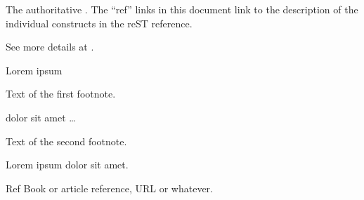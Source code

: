 \documentclass[letterpaper,12pt,english]{sphinxmanual}
\begin{document}
The authoritative .  The “ref” links in this
document link to the description of the individual constructs in the reST
reference.



See more details at .

Lorem ipsum %
\begin{footnote}[1]\sphinxAtStartFootnote
Text of the first footnote.
%
\end{footnote} dolor sit amet … %
\begin{footnote}[2]\sphinxAtStartFootnote
Text of the second footnote.
%
\end{footnote}

Lorem ipsum  dolor sit amet.

\begin{sphinxthebibliography}{Ref}
Book or article reference, URL or whatever.
\end{sphinxthebibliography}



\renewcommand{\indexname}{Index}
\printindex
\end{document}
